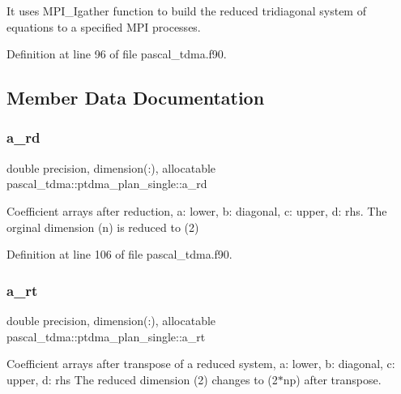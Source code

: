 It uses M\+P\+I\+\_\+\+Igather function to build the reduced tridiagonal system of equations to a specified M\+PI processes. 

Definition at line 96 of file pascal\+\_\+tdma.\+f90.



\subsection{Member Data Documentation}
\mbox{\label{structpascal__tdma_1_1ptdma__plan__single_a732d93dcbef429c1396a6f7ace9cefa6}} 
\subsubsection{\texorpdfstring{a\_rd}{a\_rd}}
{\footnotesize\ttfamily double precision, dimension(\+:), allocatable pascal\+\_\+tdma\+::ptdma\+\_\+plan\+\_\+single\+::a\+\_\+rd}



Coefficient arrays after reduction, a\+: lower, b\+: diagonal, c\+: upper, d\+: rhs. The orginal dimension (n) is reduced to (2) 



Definition at line 106 of file pascal\+\_\+tdma.\+f90.

\mbox{\label{structpascal__tdma_1_1ptdma__plan__single_ad8bed95f594c23d7df9467e204025a74}} 
\subsubsection{\texorpdfstring{a\_rt}{a\_rt}}
{\footnotesize\ttfamily double precision, dimension(\+:), allocatable pascal\+\_\+tdma\+::ptdma\+\_\+plan\+\_\+single\+::a\+\_\+rt}



Coefficient arrays after transpose of a reduced system, a\+: lower, b\+: diagonal, c\+: upper, d\+: rhs The reduced dimension (2) changes to (2$\ast$np) after transpose. 



